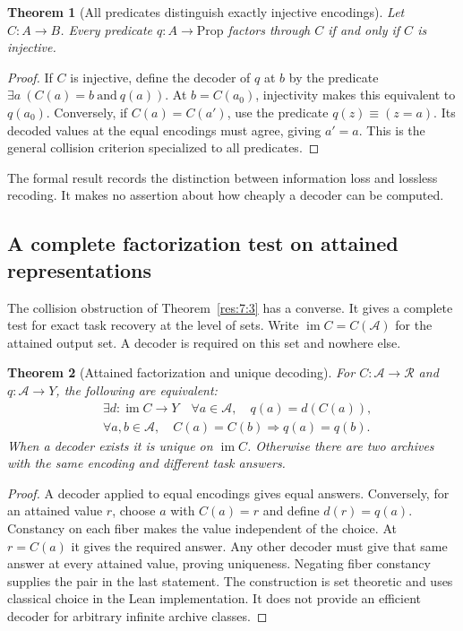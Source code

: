 \documentclass[11pt,oneside]{article}
\theoremstyle{komorebiplain}
\newtheorem{theorem}{Theorem}[section]
\theoremstyle{komorebidefinition}
\theoremstyle{komorebiremark}
\begin{document}
\begin{theorem}[All predicates distinguish exactly injective encodings]
\label{res:7:11}
\label{thm:injective-compression}
Let $C:A\to B$. Every predicate $q:A\to\mathrm{Prop}$ factors through $C$ if and only if $C$ is injective.
\end{theorem}
\begin{proof}
If $C$ is injective, define the decoder of $q$ at $b$ by the predicate $\exists a\ (C(a)=b\ \text{and}\ q(a))$. At $b=C(a_0)$, injectivity makes this equivalent to $q(a_0)$. Conversely, if $C(a)=C(a')$, use the predicate $q(z)\equiv(z=a)$. Its decoded values at the equal encodings must agree, giving $a'=a$. This is the general collision criterion specialized to all predicates.
\end{proof}

The formal result  records the distinction between information loss and lossless recoding. It makes no assertion about how cheaply a decoder can be computed.


\subsection{A complete factorization test on attained representations}
\label{sec:attained-recovery}

The collision obstruction of Theorem~\ref{res:7:3} has a converse. It gives a complete test for exact task recovery at the level of sets. Write $\operatorname{im}C=C(\mathscr A)$ for the attained output set. A decoder is required on this set and nowhere else.

\begin{theorem}[Attained factorization and unique decoding]
\label{res:new:factorization}
For $C:\mathscr A\to\mathcal R$ and $q:\mathscr A\to Y$, the following are equivalent:
\[
\begin{aligned}
 &\exists d:\operatorname{im}C\to Y\quad
       \forall a\in\mathscr A,\quad q(a)=d(C(a)),\\
 &\forall a,b\in\mathscr A,\quad C(a)=C(b)\Longrightarrow q(a)=q(b).
\end{aligned}
\]
When a decoder exists it is unique on $\operatorname{im}C$. Otherwise there are two archives with the same encoding and different task answers.
\end{theorem}
\begin{proof}
A decoder applied to equal encodings gives equal answers. Conversely, for an attained value $r$, choose $a$ with $C(a)=r$ and define $d(r)=q(a)$. Constancy on each fiber makes the value independent of the choice. At $r=C(a)$ it gives the required answer. Any other decoder must give that same answer at every attained value, proving uniqueness. Negating fiber constancy supplies the pair in the last statement. The construction is set theoretic and uses classical choice in the Lean implementation. It does not provide an efficient decoder for arbitrary infinite archive classes.
\end{proof}
\end{document}
